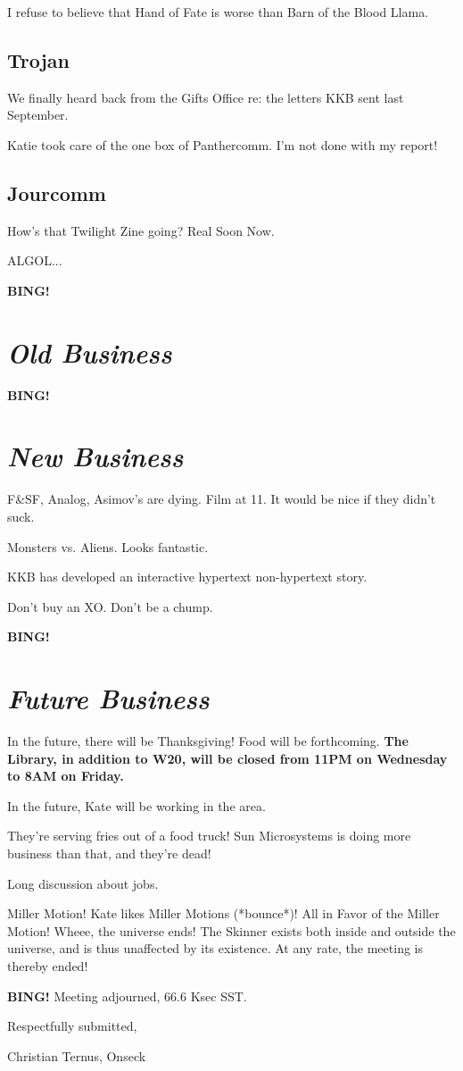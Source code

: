 \documentclass[10pt]{article}
\newcommand{\bing}{{\bf BING!} }
\newcommand{\goto}[1]{\bing \vskip 12pt \section*{{\em{#1}}}}
\begin{document}
I refuse to believe that Hand of Fate is worse than Barn of the Blood
Llama.

\subsection*{Trojan}

We finally heard back from the Gifts Office re: the letters KKB sent
last September.

Katie took care of the one box of Panthercomm.  I'm not done with my
report!

\subsection*{Jourcomm}

How's that Twilight Zine going?  Real Soon Now.

ALGOL...

\goto{Old Business}

\goto{New Business}

F\&SF, Analog, Asimov's are dying.  Film at 11.  It would be nice if
they didn't suck.

Monsters vs. Aliens.  Looks fantastic.

KKB has developed an interactive hypertext non-hypertext story.

Don't buy an XO.  Don't be a chump.

\goto{Future Business}

In the future, there will be Thanksgiving!  Food will be forthcoming.
\textbf{The Library, in addition to W20, will be closed from 11PM on
  Wednesday to 8AM on Friday.}

In the future, Kate will be working in the area.

They're serving fries out of a food truck!  Sun Microsystems is doing
more business than that, and they're dead!

Long discussion about jobs.

Miller Motion!  Kate likes Miller Motions (*bounce*)!  All in Favor of
the Miller Motion!  Wheee, the universe ends!  The Skinner exists both
inside and outside the universe, and is thus unaffected by its
existence.  At any rate, the meeting is thereby ended!

\bing
\noindent
Meeting adjourned, 66.6 Ksec SST.

\vspace{18pt}

\centerline{Respectfully submitted,}
\centerline{Christian Ternus, Onseck}
\end{document}
